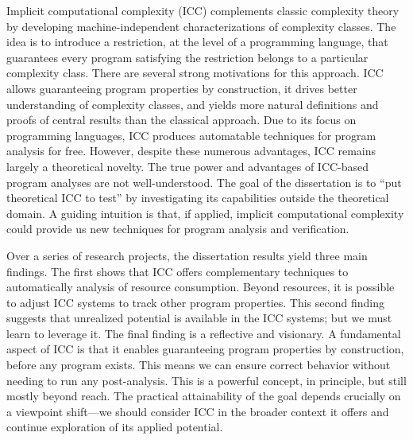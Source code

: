 Implicit computational complexity (ICC) complements classic complexity theory by developing machine-independent characterizations of complexity classes.
The idea is to introduce a restriction, at the level of a programming language, that guarantees every program satisfying the restriction belongs to a particular complexity class.
There are several strong motivations for this approach.
ICC allows guaranteeing program properties by construction, it drives better understanding of complexity classes, and yields more natural definitions and proofs of central results than the classical approach.
Due to its focus on programming languages, ICC produces automatable techniques for program analysis for free.
However, despite these numerous advantages, ICC remains largely a theoretical novelty.
The true power and advantages of ICC-based program analyses are not well-understood.
The goal of the dissertation is to ``put theoretical ICC to test'' by investigating its capabilities outside the theoretical domain.
A guiding intuition is that, if applied, implicit computational complexity could provide us new techniques for program analysis and verification.

Over a series of research projects, the dissertation results yield three main findings.
The first shows that ICC offers complementary techniques to automatically analysis of resource consumption.
Beyond resources, it is possible to adjust ICC systems to track other program properties.
This second finding suggests that unrealized potential is available in the ICC systems;
but we must learn to leverage it.
The final finding is a reflective and visionary.
A fundamental aspect of ICC is that it enables guaranteeing program properties {by construction}, before any program exists.
This means we can ensure correct behavior without needing to run any post-analysis.
This is a powerful concept, in principle, but still mostly beyond reach.
The practical attainability of the goal depends crucially on a viewpoint shift---we should consider ICC in the broader context it offers and continue exploration of its applied potential.